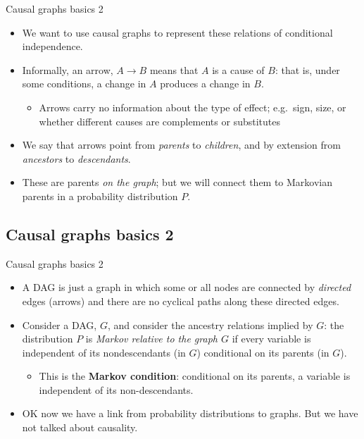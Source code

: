 \documentclass[
  11pt,
  ignorenonframetext,
]{beamer}
\providecommand{\tightlist}{%
  \setlength{\itemsep}{0pt}\setlength{\parskip}{0pt}}\usepackage{longtable,booktabs,array}
\begin{document}
\begin{frame}{Causal graphs basics 2}
\begin{itemize}
\tightlist
\item
  We want to use causal graphs to represent these relations of
  conditional independence.
\item
  Informally, an arrow, \(A \rightarrow B\) means that \(A\) is a cause
  of \(B\): that is, under some conditions, a change in \(A\) produces a
  change in \(B\).

  \begin{itemize}
  \tightlist
  \item
    Arrows carry no information about the type of effect; e.g.~sign,
    size, or whether different causes are complements or substitutes
  \end{itemize}
\item
  We say that arrows point from \emph{parents} to \emph{children}, and
  by extension from \emph{ancestors} to \emph{descendants}.
\item
  These are parents \emph{on the graph}; but we will connect them to
  Markovian parents in a probability distribution \(P\).
\end{itemize}
\end{frame}

\hypertarget{causal-graphs-basics-2-1}{%
\subsection{Causal graphs basics 2}\label{causal-graphs-basics-2-1}}

\begin{frame}{Causal graphs basics 2}
\begin{itemize}
\tightlist
\item
  A DAG is just a graph in which some or all nodes are connected by
  \emph{directed} edges (arrows) and there are no cyclical paths along
  these directed edges.
\item
  Consider a DAG, \(G\), and consider the ancestry relations implied by
  \(G\): the distribution \(P\) is \emph{Markov relative to the graph
  \(G\)} if every variable is independent of its nondescendants (in
  \(G\)) conditional on its parents (in \(G\)).

  \begin{itemize}
  \tightlist
  \item
    This is the \textbf{Markov condition}: conditional on its parents, a
    variable is independent of its non-descendants.
  \end{itemize}
\item
  OK now we have a link from probability distributions to graphs. But we
  have not talked about causality.
\end{itemize}
\end{frame}
\end{document}
